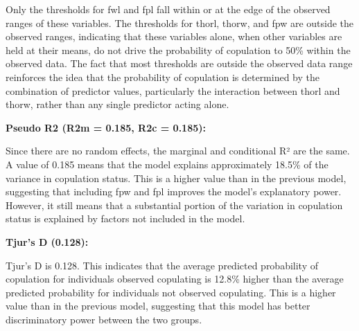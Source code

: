 \documentclass[
]{article}
\begin{document}
Only the thresholds for fwl and fpl fall within or at the edge of the
observed ranges of these variables. The thresholds for thorl, thorw, and
fpw are outside the observed ranges, indicating that these variables
alone, when other variables are held at their means, do not drive the
probability of copulation to 50\% within the observed data. The fact
that most thresholds are outside the observed data range reinforces the
idea that the probability of copulation is determined by the combination
of predictor values, particularly the interaction between thorl and
thorw, rather than any single predictor acting alone.

\textbf{Pseudo R2 (R2m = 0.185, R2c = 0.185):}

Since there are no random effects, the marginal and conditional R² are
the same. A value of 0.185 means that the model explains approximately
18.5\% of the variance in copulation status. This is a higher value than
in the previous model, suggesting that including fpw and fpl improves
the model's explanatory power. However, it still means that a
substantial portion of the variation in copulation status is explained
by factors not included in the model.

\textbf{Tjur's D (0.128):}

Tjur's D is 0.128. This indicates that the average predicted probability
of copulation for individuals observed copulating is 12.8\% higher than
the average predicted probability for individuals not observed
copulating. This is a higher value than in the previous model,
suggesting that this model has better discriminatory power between the
two groups.
\end{document}

